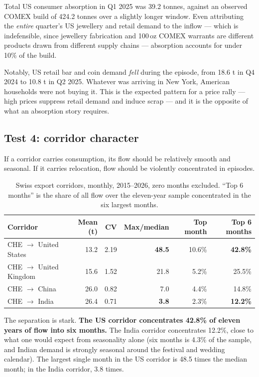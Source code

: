 \documentclass[11pt,a4paper]{article}
\begin{document}
Total US consumer absorption in Q1 2025 was 39.2 tonnes, against an observed COMEX build of
424.2 tonnes over a slightly longer window. Even attributing the \emph{entire} quarter's US
jewellery and retail demand to the inflow --- which is indefensible, since jewellery
fabrication and 100\,oz COMEX warrants are different products drawn from different supply
chains --- absorption accounts for under 10\% of the build.

Notably, US retail bar and coin demand \emph{fell} during the episode, from 18.6 t in Q4 2024
to 10.8 t in Q2 2025. Whatever was arriving in New York, American households were not buying
it. This is the expected pattern for a price rally --- high prices suppress retail demand and
induce scrap --- and it is the opposite of what an absorption story requires.

\subsection{Test 4: corridor character}

If a corridor carries consumption, its flow should be relatively smooth and seasonal. If it
carries relocation, flow should be violently concentrated in episodes.

\begin{table}[h]
\centering
\begin{tabular}{@{}lrrrrr@{}}
\toprule
\textbf{Corridor} & \textbf{Mean (t)} & \textbf{CV} & \textbf{Max/median} &
\textbf{Top month} & \textbf{Top 6 months} \\
\midrule
CHE $\to$ United States & 13.2 & 2.19 & \textbf{48.5} & 10.6\% & \textbf{42.8\%} \\
CHE $\to$ United Kingdom & 15.6 & 1.52 & 21.8 & 5.2\% & 25.5\% \\
CHE $\to$ China & 26.0 & 0.82 & 7.0 & 4.4\% & 14.8\% \\
CHE $\to$ India & 26.4 & 0.71 & \textbf{3.8} & 2.3\% & \textbf{12.2\%} \\
\bottomrule
\end{tabular}
\caption{Swiss export corridors, monthly, 2015--2026, zero months excluded. ``Top 6 months''
is the share of all flow over the eleven-year sample concentrated in the six largest months.}
\label{tab:corridor}
\end{table}

The separation is stark. \textbf{The US corridor concentrates 42.8\% of eleven years of flow
into six months.} The India corridor concentrates 12.2\%, close to what one would expect from
seasonality alone (six months is 4.3\% of the sample, and Indian demand is strongly seasonal
around the festival and wedding calendar). The largest single month in the US corridor is 48.5
times the median month; in the India corridor, 3.8 times.
\end{document}
